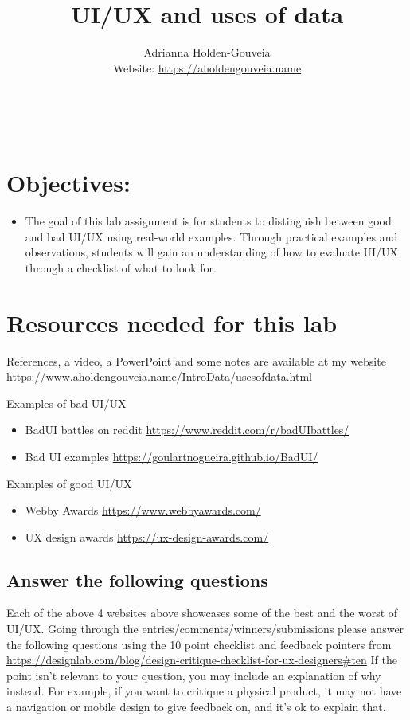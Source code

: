 \documentclass[12pt]{article}
\title{UI/UX and uses of data}
\author{
        Adrianna Holden-Gouveia \\
        Website: \url{https://aholdengouveia.name}\\ 
        \date{\vspace{-5ex}}
        \faLinkedin{: aholdengouveia} \\
        \faGithub {: aholdengouveia} \\
        }
\begin{document}
    

\maketitle


\section*{Objectives:}
\begin{itemize}
    \item The goal of this lab assignment is for students to distinguish between good and bad UI/UX using real-world examples. Through practical examples and observations, students will gain an understanding of how to evaluate UI/UX through a checklist of what to look for.
\end{itemize}


\section*{Resources needed for this lab}

References, a video, a PowerPoint and some notes are available at my website
\url {https://www.aholdengouveia.name/IntroData/usesofdata.html}

Examples of bad UI/UX
\begin{itemize}
    \item BadUI battles on reddit \url{https://www.reddit.com/r/badUIbattles/}
    \item Bad UI examples \url{https://goulartnogueira.github.io/BadUI/}
\end{itemize}    

Examples of good UI/UX
\begin{itemize}
    \item Webby Awards \url{https://www.webbyawards.com/}
    \item UX design awards \url{https://ux-design-awards.com/}
\end{itemize}


\subsection*{Answer the following questions}
Each of the above 4 websites above showcases some of the best and the worst of UI/UX. Going through the entries/comments/winners/submissions please answer the following questions using the 10 point checklist and feedback pointers from \url{https://designlab.com/blog/design-critique-checklist-for-ux-designers#ten} If the point isn't relevant to your question, you may include an explanation of why instead. For example, if you want to critique a physical product, it may not have a navigation or mobile design to give feedback on, and it's ok to explain that. 
\end{document}
